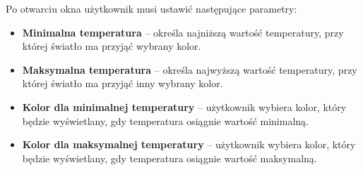 \documentclass[12pt]{article}
\begin{document}
Po otwarciu okna użytkownik musi ustawić następujące parametry:
\begin{itemize}
    \item \textbf{Minimalna temperatura} – określa najniższą wartość temperatury, przy której światło ma przyjąć wybrany kolor.
    \item \textbf{Maksymalna temperatura} – określa najwyższą wartość temperatury, przy której światło ma przyjąć inny wybrany kolor.
    \item \textbf{Kolor dla minimalnej temperatury} – użytkownik wybiera kolor, który będzie wyświetlany, gdy temperatura osiągnie wartość minimalną.
    \item \textbf{Kolor dla maksymalnej temperatury} – użytkownik wybiera kolor, który będzie wyświetlany, gdy temperatura osiągnie wartość maksymalną.
\end{itemize}
\end{document}
